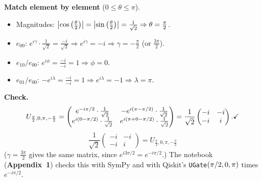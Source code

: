 \documentclass[a4paper, 10pt]{article}
\begin{document}
\begin{solution}
	\noindent \textbf{Match element by element} (\( 0 \le \theta \le \pi \)).
	\begin{itemize}
		\item Magnitudes: \( \left|\cos\left(\frac{\theta}{2}\right)\right| = \left|\sin\left(\frac{\theta}{2}\right)\right| = \frac{1}{\sqrt{2}} \Rightarrow \theta = \frac{\pi}{2} \).
		\item \( e_{00} \): \( e^{i\gamma}\cdot\frac{1}{\sqrt{2}} = \frac{-i}{\sqrt{2}} \Rightarrow e^{i\gamma} = -i \Rightarrow \gamma = -\frac{\pi}{2} \) (or \( \frac{3\pi}{2} \)).
		\item \( e_{10}/e_{00} \): \( e^{i\phi} = \frac{-i}{-i} = 1 \Rightarrow \phi = 0 \).
		\item \( e_{01}/e_{00} \): \( -e^{i\lambda} = \frac{-i}{-i} = 1 \Rightarrow e^{i\lambda} = -1 \Rightarrow \lambda = \pi \).
	\end{itemize}
	\noindent \textbf{Check.}
	\[
		U_{\frac{\pi}{2}, 0, \pi, -\frac{\pi}{2}} = \begin{pmatrix}
			e^{-i\pi/2}\cdot\frac{1}{\sqrt{2}}                  & -e^{i\left(\pi - \pi/2\right)}\cdot\frac{1}{\sqrt{2}}       \\
			e^{i\left(0 - \pi/2\right)}\cdot\frac{1}{\sqrt{2}}       & e^{i\left(\pi + 0 - \pi/2\right)}\cdot\frac{1}{\sqrt{2}}
		\end{pmatrix}
		= \frac{1}{\sqrt{2}}\begin{pmatrix} -i & -i \\ -i & i \end{pmatrix}. \checkmark
	\]
	\[
		\boxed{\ \frac{1}{\sqrt{2}}\begin{pmatrix} -i & -i \\ -i & i \end{pmatrix} = U_{\frac{\pi}{2}, 0, \pi, -\frac{\pi}{2}}\ }
	\]
	(\( \gamma = \frac{3\pi}{2} \) gives the same matrix, since \( e^{i3\pi/2} = e^{-i\pi/2} \).)
	The notebook (\textbf{Appendix~1}) checks this with SymPy and with Qiskit's \texttt{UGate}\( \left(\pi/2, 0, \pi\right) \) times \( e^{-i\pi/2} \).
\end{solution}
\end{document}
